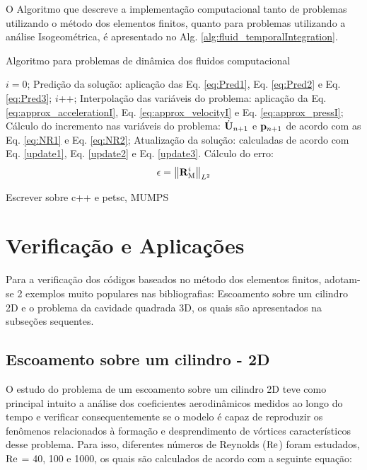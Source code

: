 \documentclass[tese_patricia]{subfiles}%
\begin{document}
O Algoritmo que descreve a implementação computacional tanto de problemas utilizando o método dos elementos finitos, quanto para problemas utilizando a análise Isogeométrica, é apresentado no Alg. \ref{alg:fluid_temporalIntegration}.

\begin{algorithm}
	\caption{Algoritmo para problemas de dinâmica dos fluidos computacional}
	\label{alg:fluid_temporalIntegration}
	\begin{algorithmic}[1]
		\State $i=0$;
		\State Predição da solução: aplicação das Eq. \eqref{eq:Pred1}, Eq. \eqref{eq:Pred2} e Eq. \eqref{eq:Pred3};
		\State $i$++;
		\State Interpolação das variáveis do problema: aplicação da Eq. \eqref{eq:approx_accelerationI}, Eq. \eqref {eq:approx_velocityI} e Eq. \eqref{eq:approx_pressI};
		\State Cálculo do incremento nas variáveis do problema: $\dot{\mathbf{U}}_{n+1}$ e $\mathbf{p}_{n+1}$ de acordo com as Eq. \eqref{eq:NR1} e Eq. \eqref{eq:NR2};
		\State Atualização da solução: calculadas de acordo com Eq. \eqref{update1}, Eq. \eqref{update2} e Eq. \eqref{update3}.
		\State Cálculo do erro:
		\begin{align}
		\epsilon =\left\| \mathbf{R}_\mathrm{M}^i \right\|_{L^2}
		\end{align}
		\EndWhile
		\EndFor
	\end{algorithmic}
\end{algorithm}


Escrever sobre c++ e petsc, MUMPS


\section{Verificação e Aplicações}

Para a verificação dos códigos baseados no método dos elementos finitos, adotam-se 2 exemplos muito populares nas bibliografias: Escoamento sobre um cilindro 2D e o problema da cavidade quadrada 3D, os quais são apresentados na subseções sequentes.

\subsection{Escoamento sobre um cilindro - 2D} \label{subsection:escoamentocil2d}

O estudo do problema de um escoamento sobre um cilindro 2D teve como principal intuito a análise dos coeficientes aerodinâmicos medidos ao longo do tempo e verificar consequentemente se o modelo é capaz de reproduzir os fenômenos relacionados à formação e desprendimento de vórtices característicos desse problema. Para isso, diferentes números de Reynolds ($\mathrm{Re}$) foram estudados, $\mathrm{Re}$ = 40, 100 e 1000, os quais são calculados de acordo com a seguinte equação:
\end{document}
